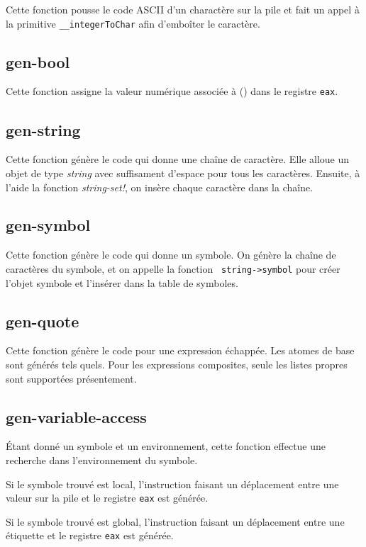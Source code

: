\documentclass[10pt]{report}
\begin{document}
Cette fonction pousse le code ASCII d'un charactère sur la pile et
fait un appel à la primitive {\tt __integerToChar} afin d'emboîter le
caractère.

\subsection{gen-bool}

Cette fonction assigne la valeur numérique associée à () dans le
registre {\tt eax}.

\subsection{gen-string}

Cette fonction génère le code qui donne une chaîne de caractère.  Elle
alloue un objet de type {\it string} avec suffisament d'espace pour
tous les caractères.  Ensuite, à l'aide la fonction {\it string-set!},
on insère chaque caractère dans la chaîne.

\subsection{gen-symbol}

Cette fonction génère le code qui donne un symbole.  On génère la
chaîne de caractères du symbole, et on appelle la fonction {\tt
  string->symbol} pour créer l'objet symbole et l'insérer dans la
table de symboles.

\subsection{gen-quote}

Cette fonction génère le code pour une expression échappée. Les atomes
de base sont générés tels quels. Pour les expressions composites,
seule les listes propres sont supportées présentement.

\subsection{gen-variable-access}

Étant donné un symbole et un environnement, cette fonction effectue
une recherche dans l'environnement du symbole.

Si le symbole trouvé est local, l'instruction faisant un déplacement
entre une valeur sur la pile et le registre {\tt eax} est générée.

Si le symbole trouvé est global, l'instruction faisant un déplacement
entre une étiquette et le registre {\tt eax} est générée.
\end{document}
